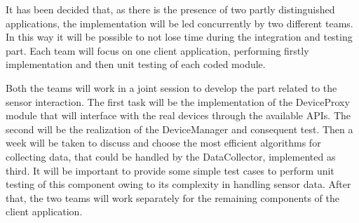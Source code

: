 {}
{\setlength{\parskip}{0.5cm}
It has been decided that, as there is the presence of two partly distinguished applications, the implementation will be led concurrently by two different teams. In this way it will be possible to not lose time during the integration and testing part. Each team will focus on one client application, performing firstly implementation and then unit testing of each coded module. 


{}
Both the teams will work in a joint session to develop the part related to the sensor interaction. The first task will be the implementation of the DeviceProxy module that will interface with the real devices through the available APIs. The second will be the realization of the DeviceManager and consequent test. Then a week will be taken to discuss and choose the most efficient algorithms for collecting data, that could be handled by the DataCollector, implemented as third. It will be important to provide some simple test cases to perform unit testing of this component owing to its complexity in handling sensor data. After that, the two teams will work separately for the remaining components of the client application.

}
